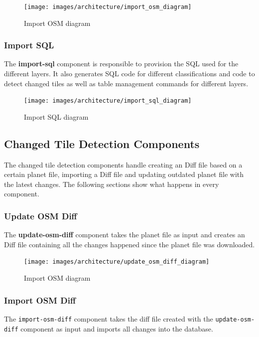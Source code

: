 \begin{figure}[H]
  \centering
  \texttt{[image: images/architecture/import\_osm\_diagram]}
  \caption{Import OSM diagram}
\end{figure}

\subsubsection{Import SQL}

The \textbf{import-sql} component is responsible to provision the SQL used for the different layers. It also generates SQL code for different classifications and code to detect changed tiles as well as table management commands for different layers.

\begin{figure}[H]
  \centering
  \texttt{[image: images/architecture/import\_sql\_diagram]}
  \caption{Import SQL diagram}
\end{figure}

\subsection{Changed Tile Detection Components}

The changed tile detection components handle creating an \osm{} Diff file based on a certain \osm{} planet file, importing a \osm{} Diff file and updating outdated \osm{} planet file with the latest changes. The following sections show what happens in every component.

\subsubsection{Update OSM Diff}

The \textbf{update-osm-diff} component takes the planet file as input and creates an \osm{} Diff file containing all the changes happened since the planet file was downloaded.

\begin{figure}[H]
  \centering
  \texttt{[image: images/architecture/update\_osm\_diff\_diagram]}
  \caption{Import OSM diagram}
\end{figure}

\subsubsection{Import OSM Diff}

The \texttt{import-osm-diff} component takes the \osm{} diff file created with the \texttt{update-osm-diff} component as input and imports all changes into the database.

